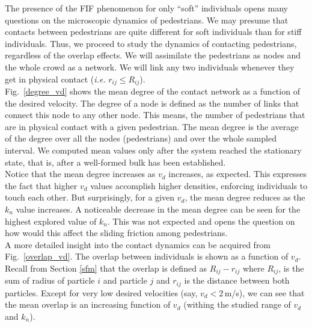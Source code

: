 \documentclass[preprint,12pt]{elsarticle}
\begin{document}
The presence of the FIF phenomenon for only ``soft'' individuals opens many questions 
on the microscopic dynamics of pedestrians. We may presume that contacts 
between pedestrians are quite different for soft individuals than for stiff 
individuals. Thus, we proceed to study the dynamics of contacting pedestrians, regardless of the overlap 
effects. We will assimilate the pedestrians as nodes and the whole crowd as a 
network. We will link any two individuals whenever they get in physical 
contact (\textit{i.e.} $r_{ij} \leq R_{ij}$).\\

Fig.~\ref{degree_vd} shows the mean degree of the contact network as a function  
of the desired velocity. The degree of a node is defined as the number of links 
that connect this node to any other node. This means, the number of pedestrians 
that are in physical contact with a given pedestrian. The mean degree is the 
average of the degree over all the nodes (pedestrians) and over the whole 
sampled interval. We computed mean values only after the system reached the stationary 
state, that is, after a well-formed bulk has been established.\\

Notice that the mean degree increases as $v_d$ increases, as expected. This expresses the fact that
higher $v_d$ values accomplish higher densities, enforcing individuals to touch each 
other. But surprisingly, for a given $v_d$, the mean degree reduces as the $k_n$ 
value increases. A noticeable decrease in the mean degree can be seen for the 
highest explored value of $k_n$. This was not expected and opens the question on how would
this affect the sliding friction among pedestrians.\\

A more detailed insight into the contact dynamics can be acquired from 
Fig.~\ref{overlap_vd}. The overlap between individuals is shown as a function of 
$v_d$. Recall from Section \ref{sfm} that the overlap is defined as 
$R_{ij}-r_{ij}$ where $R_{ij}$, is the sum of radius of particle $i$ and 
particle $j$ and $r_{ij}$  is the distance between both particles. Except for 
very low desired velocities (say, $v_d<2\,$m/s), we can see that the mean 
overlap is an increasing function of $v_d$ (withing the studied
range of $v_d$ and $k_n$).\\
\end{document}
